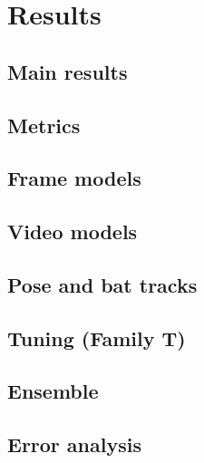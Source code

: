 \section{Results}\label{sec:results}


\subsection{Main results}\label{sec:main_results}





\subsection{Metrics}


\subsection{Frame models}

\subsection{Video models}

\subsection{Pose and bat tracks}

\subsection{Tuning (Family T)}

\subsection{Ensemble}

\subsection{Error analysis}


